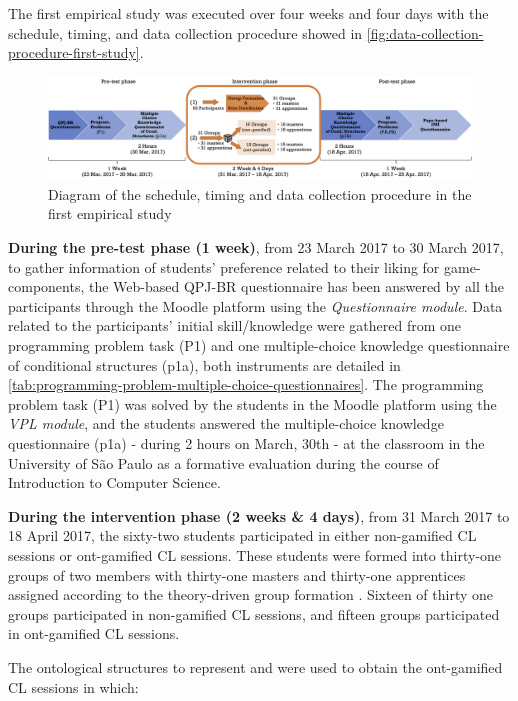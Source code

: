 The first empirical study was executed over four weeks and four days with the schedule, timing, and data collection procedure showed in \autoref{fig:data-collection-procedure-first-study}.

\begin{figure}[htb]
 \caption{Diagram of the schedule, timing and data collection procedure in the first empirical study}
 \label{fig:data-collection-procedure-first-study}
 \centering
 \includegraphics[width=1\textwidth]{images/chap-evaluation/data-collection-procedure-first-study.png}
 \fautor
\end{figure}

\textbf{During the pre-test phase (1 week)}, from 23 March 2017 to 30 March 2017, to gather information of students' preference related to their liking for game-components, the Web-based QPJ-BR questionnaire has been answered by all the participants through the Moodle platform using the \emph{Questionnaire module}.
Data related to the participants' initial skill/knowledge were gathered from one programming problem task (P1) and one multiple-choice knowledge questionnaire of conditional structures (p1a), both instruments are detailed in \autoref{tab:programming-problem-multiple-choice-questionnaires}. 
The programming problem task (P1) was solved by the students in the Moodle platform using the \emph{VPL module}, and the students answered the multiple-choice knowledge questionnaire (p1a) - during 2 hours on March, 30th - at the classroom in the University of São Paulo as a formative evaluation during the course of Introduction to Computer Science. 

\textbf{During the intervention phase (2 weeks \& 4 days)}, from 31 March 2017 to 18 April 2017, the sixty-two students participated in either non-gamified CL sessions or ont-gamified CL sessions.
These students were formed into thirty-one groups of two members with thirty-one masters and thirty-one apprentices assigned according to the theory-driven group formation \cite{IsotaniMizoguchi2008a}. 
Sixteen of thirty one groups participated in non-gamified CL sessions, and fifteen groups participated in ont-gamified CL sessions.

The ontological structures to represent  and  were used to obtain the ont-gamified CL sessions in which:

